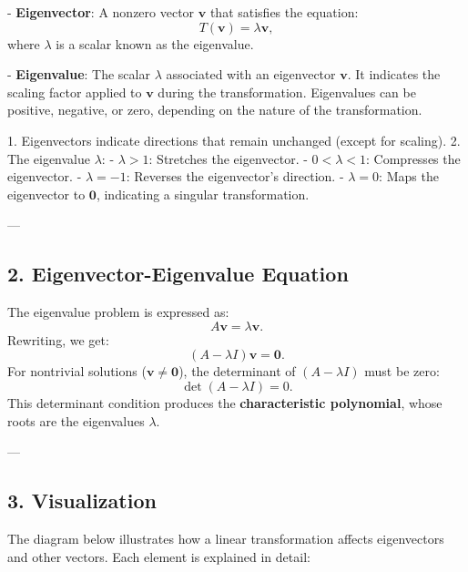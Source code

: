 \documentclass[11pt]{article}
\begin{document}
- \textbf{Eigenvector}: A nonzero vector \( \mathbf{v} \) that satisfies the equation:
\[
T(\mathbf{v}) = \lambda \mathbf{v},
\]
where \( \lambda \) is a scalar known as the eigenvalue.

- \textbf{Eigenvalue}: The scalar \( \lambda \) associated with an eigenvector \( \mathbf{v} \). It indicates the scaling factor applied to \( \mathbf{v} \) during the transformation. Eigenvalues can be positive, negative, or zero, depending on the nature of the transformation.


1. Eigenvectors indicate directions that remain unchanged (except for scaling).
2. The eigenvalue \( \lambda \):
   - \( \lambda > 1 \): Stretches the eigenvector.
   - \( 0 < \lambda < 1 \): Compresses the eigenvector.
   - \( \lambda = -1 \): Reverses the eigenvector's direction.
   - \( \lambda = 0 \): Maps the eigenvector to \( \mathbf{0} \), indicating a singular transformation.

---

\subsection*{2. Eigenvector-Eigenvalue Equation}
The eigenvalue problem is expressed as:
\[
A\mathbf{v} = \lambda \mathbf{v}.
\]
Rewriting, we get:
\[
(A - \lambda I)\mathbf{v} = \mathbf{0}.
\]
For nontrivial solutions (\( \mathbf{v} \neq \mathbf{0} \)), the determinant of \( (A - \lambda I) \) must be zero:
\[
\det(A - \lambda I) = 0.
\]
This determinant condition produces the \textbf{characteristic polynomial}, whose roots are the eigenvalues \( \lambda \).

---

\subsection*{3. Visualization}

The diagram below illustrates how a linear transformation affects eigenvectors and other vectors. Each element is explained in detail:
\end{document}
